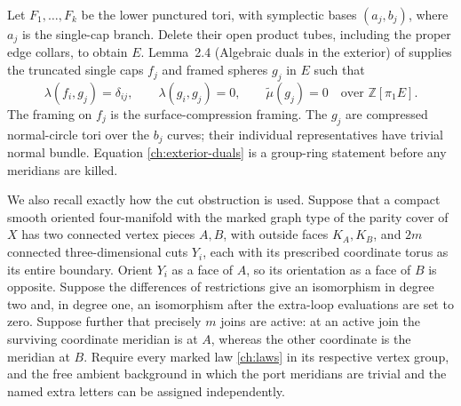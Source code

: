 \documentclass[11pt]{article}
\theoremstyle{definition}
\theoremstyle{remark}
\newcommand{\Z}{\mathbb Z}
\begin{document}
Let $F_1,\ldots,F_k$ be the lower punctured tori, with symplectic bases
$(a_j,b_j)$, where $a_j$ is the single-cap branch.  Delete their open
product tubes, including the proper edge collars, to obtain $E$.
Lemma~2.4 (Algebraic duals in the exterior) of \cite{TO} supplies
the truncated single caps $f_j$ and framed spheres $g_j$ in $E$ such
that
\begin{equation}
\label{ch:exterior-duals}
 \lambda(f_i,g_j)=\delta_{ij},\qquad
 \lambda(g_i,g_j)=0,\qquad \widetilde\mu(g_j)=0
 \quad\text{over }\Z[\pi_1E].
\end{equation}
The framing on $f_j$ is the surface-compression framing.  The $g_j$
are compressed normal-circle tori over the $b_j$ curves; their
individual representatives have trivial normal bundle.  Equation
\eqref{ch:exterior-duals} is a group-ring statement before any
meridians are killed.

We also recall exactly how the cut obstruction is used.  Suppose that a
compact smooth oriented four-manifold with the marked graph type of
the parity cover of $X$ has two connected vertex pieces $A,B$, with
outside faces $K_A,K_B$, and $2m$ connected three-dimensional cuts
$Y_i$, each with its prescribed coordinate torus as its entire boundary.
Orient $Y_i$ as a face of $A$, so its orientation as a face of $B$
is opposite.
Suppose the differences of restrictions give an isomorphism in degree
two and, in degree one, an isomorphism after the extra-loop evaluations
are set to zero.  Suppose further that precisely $m$ joins are active:
at an active join the surviving coordinate meridian is at $A$, whereas
the other coordinate is the meridian at $B$.  Require every marked law
\eqref{ch:laws} in its respective vertex group, and the free ambient
background in which the port meridians are trivial and the named extra
letters can be assigned independently.
\end{document}
